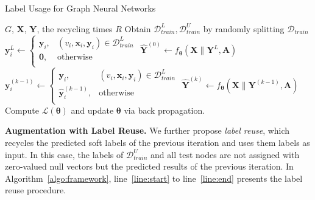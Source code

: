 \documentclass[sigconf,screen,nonacm]{acmart} \usepackage{booktabs}
\newcommand{\bs}{\boldsymbol}
\newcommand{\bA}{\bs{A}}
\newcommand{\bx}{\bs{x}}
\newcommand{\bX}{\bs{X}}
\newcommand{\by}{\bs{y}}
\newcommand{\bY}{\bs{Y}}
\newcommand{\btheta}{\bs{\theta}}
\newcommand{\minisection}[1]{\vspace{5pt}\noindent\textbf{#1.}}
\begin{document}
	\begin{algorithm}[t]
		\caption{Label Usage for Graph Neural Networks}
		\label{algo:framework}
		\begin{algorithmic}[1]
			\REQUIRE $G$, $\bX$, $\bY$, the recycling times $R$
\STATE Obtain $\mathcal{D}^L_{train},\mathcal{D}^U_{train}$ by randomly splitting $\mathcal{D}_{train}$
			\STATE $\by^L_{i} \leftarrow \begin{cases}\by_i, & (v_i,\bx_i,\by_i)\in \mathcal{D}^L_{train}\\\mathbf 0, & \text{otherwise}\\\end{cases}$
			\label{line:linelabel}
			\STATE $\hat{\bY}^{(0)} \leftarrow f_{\btheta}(\bX \parallel \bY^L, \bA)$
			\label{line:start}
			\STATE $\by_{i}^{(k-1)} \leftarrow \begin{cases}\by_i, & (v_i,\bx_i,\by_i)\in \mathcal{D}^L_{train}\\ \hat{\by}_{i}^{(k-1)}, & \text{otherwise}\\\end{cases}$
			\STATE $\hat{\bY}^{(k)}\leftarrow f_{\btheta}(\bX \parallel \bY^{(k-1)}, \bA)$
			\ENDFOR
			\label{line:end}
			\STATE Compute $\mathcal{L}(\btheta)$ and update $\btheta$ via back propagation.
			\ENDFOR
		\end{algorithmic}
	\end{algorithm}


	\minisection{Augmentation with Label Reuse}
	We further propose \textit{label reuse}, which recycles the predicted soft labels of the previous iteration and uses them labels as input.
	In this case, the labels of $\mathcal{D}_{train}^U$ and all test nodes are not assigned with zero-valued null vectors but the predicted results of the previous iteration.
In Algorithm~\ref{algo:framework}, line~\ref{line:start} to line~\ref{line:end} presents the label reuse procedure.
\end{document}
